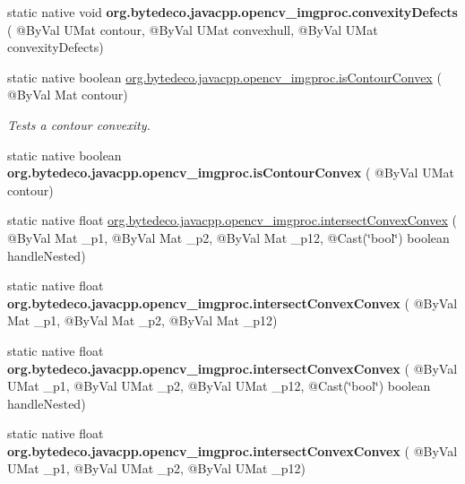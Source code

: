 \begin{DoxyCompactItemize}
\mbox{\label{group__imgproc__shape_ga966bc37c9cf3731f716461c3ac5820c5}} 
static native void {\bfseries org.\+bytedeco.\+javacpp.\+opencv\+\_\+imgproc.\+convexity\+Defects} ( @By\+Val U\+Mat contour, @By\+Val U\+Mat convexhull, @By\+Val U\+Mat convexity\+Defects)
\item 
static native boolean \hyperlink{group__imgproc__shape_gad00ac2d87b83a753b5edcdbb2daf526f}{org.\+bytedeco.\+javacpp.\+opencv\+\_\+imgproc.\+is\+Contour\+Convex} ( @By\+Val Mat contour)
\begin{DoxyCompactList}\small\item\em Tests a contour convexity. \end{DoxyCompactList}\item 
\mbox{\label{group__imgproc__shape_ga8189ade3a7d61fb8ceb6ab782007112b}} 
static native boolean {\bfseries org.\+bytedeco.\+javacpp.\+opencv\+\_\+imgproc.\+is\+Contour\+Convex} ( @By\+Val U\+Mat contour)
\item 
static native float \hyperlink{group__imgproc__shape_ga1664076df6a9c8e2780c3650b12551a1}{org.\+bytedeco.\+javacpp.\+opencv\+\_\+imgproc.\+intersect\+Convex\+Convex} ( @By\+Val Mat \+\_\+p1, @By\+Val Mat \+\_\+p2, @By\+Val Mat \+\_\+p12, @Cast(\char`\"{}bool\char`\"{}) boolean handle\+Nested)
\item 
\mbox{\label{group__imgproc__shape_gada15f5267d8e5a7fbd89874f6442c785}} 
static native float {\bfseries org.\+bytedeco.\+javacpp.\+opencv\+\_\+imgproc.\+intersect\+Convex\+Convex} ( @By\+Val Mat \+\_\+p1, @By\+Val Mat \+\_\+p2, @By\+Val Mat \+\_\+p12)
\item 
\mbox{\label{group__imgproc__shape_ga7a1d0ab280a855959142c809ec18874c}} 
static native float {\bfseries org.\+bytedeco.\+javacpp.\+opencv\+\_\+imgproc.\+intersect\+Convex\+Convex} ( @By\+Val U\+Mat \+\_\+p1, @By\+Val U\+Mat \+\_\+p2, @By\+Val U\+Mat \+\_\+p12, @Cast(\char`\"{}bool\char`\"{}) boolean handle\+Nested)
\item 
\mbox{\label{group__imgproc__shape_ga9e788b99eb471cf0511dfdbad7b6ce23}} 
static native float {\bfseries org.\+bytedeco.\+javacpp.\+opencv\+\_\+imgproc.\+intersect\+Convex\+Convex} ( @By\+Val U\+Mat \+\_\+p1, @By\+Val U\+Mat \+\_\+p2, @By\+Val U\+Mat \+\_\+p12)

\end{DoxyCompactItemize}
